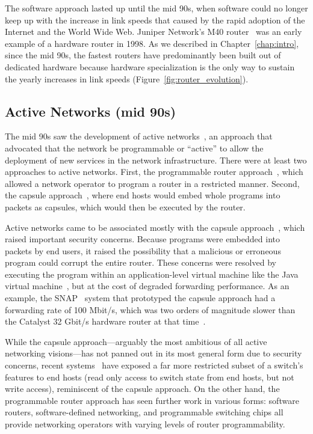 The software approach lasted up until the mid 90s, when software could no
longer keep up with the increase in link speeds that caused by the rapid
adoption of the Internet and the World Wide Web. Juniper Network's M40
router~\cite{juniperm40} was an early example of a hardware router in 1998.  As
we described in Chapter~\ref{chap:intro}, since the mid 90s, the fastest
routers have predominantly been built out of dedicated hardware because
hardware specialization is the only way to sustain the yearly increases in link
speeds (Figure~\ref{fig:router_evolution}).

\subsection{Active Networks (mid 90s)}
The mid 90s saw the development of active networks~\cite{ants, switchware}, an
approach that advocated that the network be programmable or ``active'' to allow
the deployment of new services in the network infrastructure. There were at
least two approaches to active networks. First, the programmable router
approach~\cite{switchware}, which allowed a network operator to program a
router in a restricted manner. Second, the capsule approach~\cite{ants}, where
end hosts would embed whole programs into packets as capsules, which would then
be executed by the router.

Active networks came to be associated mostly with the capsule
approach~\cite{sdn_history}, which raised important security concerns. Because
programs were embedded into packets by end users, it raised the possibility
that a malicious or erroneous program could corrupt the entire router. These
concerns were resolved by executing the program within an application-level
virtual machine like the Java virtual machine~\cite{ants}, but at the cost of
degraded forwarding performance. As an example, the SNAP~\cite{snap} system
that prototyped the capsule approach had a forwarding rate of 100 Mbit/s, which
was two orders of magnitude slower than the Catalyst 32 Gbit/s hardware router
at that time~\cite{catalyst}.

While the capsule approach---arguably the most ambitious of all active
networking visions---has not panned out in its most general form due to
security concerns, recent systems~\cite{int} have exposed a far more restricted
subset of a switch's features to end hosts (\eg read only access to switch
state from end hosts, but not write access), reminiscent of the capsule
approach. On the other hand, the programmable router approach has seen further
work in various forms: software routers, software-defined networking, and
programmable switching chips all provide networking operators with varying
levels of router programmability.

